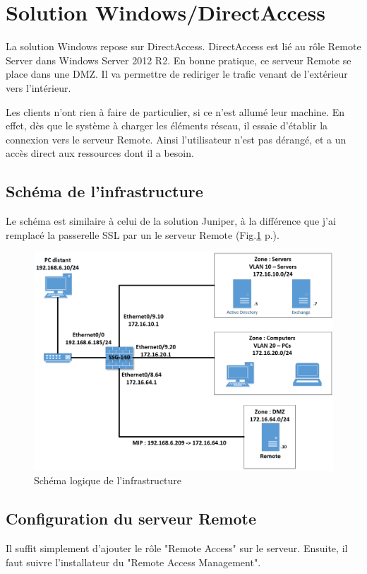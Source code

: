 \section{Solution Windows/DirectAccess}
La solution Windows repose sur DirectAccess.
DirectAccess est lié au rôle Remote Server dans Windows Server 2012 R2.
En bonne pratique, ce serveur Remote se place dans une DMZ.
Il va permettre de rediriger le trafic venant de l'extérieur vers l'intérieur. 

Les clients n'ont rien à faire de particulier, si ce n'est allumé leur machine.
En effet, dès que le système à charger les éléments réseau, il essaie d'établir la connexion vers le serveur Remote.
Ainsi l'utilisateur n'est pas dérangé, et a un accès direct aux ressources dont il a besoin.

\subsection{Schéma de l'infrastructure}
Le schéma est similaire à celui de la solution Juniper, à la différence que j'ai remplacé la passerelle SSL par un le serveur Remote (Fig.\ref{fig:schemaDA} p.\pageref{fig:schemaDA}).

\begin{figure}[ht]
	\centering
	\includegraphics[width=16cm]{DA/schema.png}
	\caption{Schéma logique de l'infrastructure}
	\label{fig:schemaDA}
\end{figure}

\subsection{Configuration du serveur Remote}
Il suffit simplement d'ajouter le rôle "Remote Access" sur le serveur.
Ensuite, il faut suivre l'installateur du "Remote Access Management".

